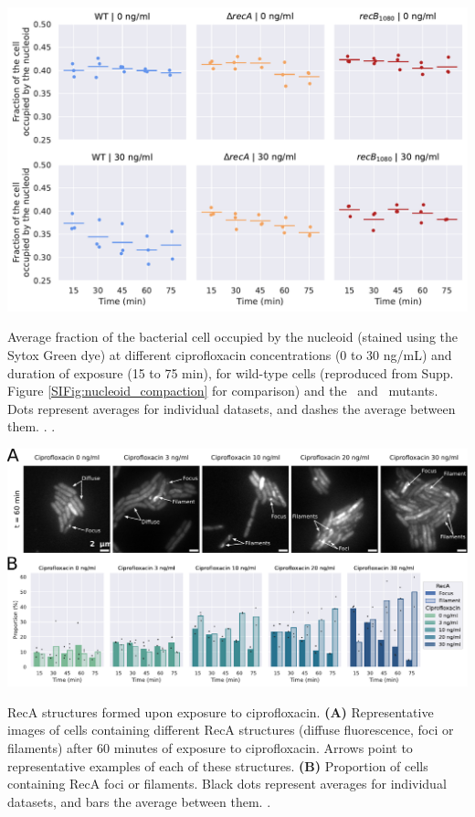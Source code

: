 \begin{suppfigure*}[htbp]
    \begin{center}
    \includegraphics[width=.8\textwidth]{SI_Figures/Mutants_nucleoid_compaction.pdf}
    \end{center}
    \caption{Average fraction of the bacterial cell occupied by the nucleoid (stained using the Sytox Green dye) at different ciprofloxacin concentrations (0 to 30 ng/mL) and duration of exposure (15 to 75 min), for wild-type cells (reproduced from Supp. Figure \ref{SIFig:nucleoid_compaction} for comparison) and the \dreca\ and \geneteneighty\ mutants. Dots represent averages for individual datasets, and dashes the average between them. . .}
    \label{SIFig:mutants_nucleoid_compaction}
\end{suppfigure*}

\begin{suppfigure*}[htbp]
    \begin{center}
    \includegraphics[width=\textwidth]{SI_Figures/RecA_structures.pdf}
    \end{center}
    \caption{RecA structures formed upon exposure to ciprofloxacin. \textbf{(A)} Representative images of cells containing different RecA structures (diffuse fluorescence, foci or filaments) after 60 minutes of exposure to ciprofloxacin. Arrows point to representative examples of each of these structures. \textbf{(B)} Proportion of cells containing RecA foci or filaments. Black dots represent averages for individual datasets, and bars the average between them. .}
    \label{SIFig:reca_structures}
\end{suppfigure*}
